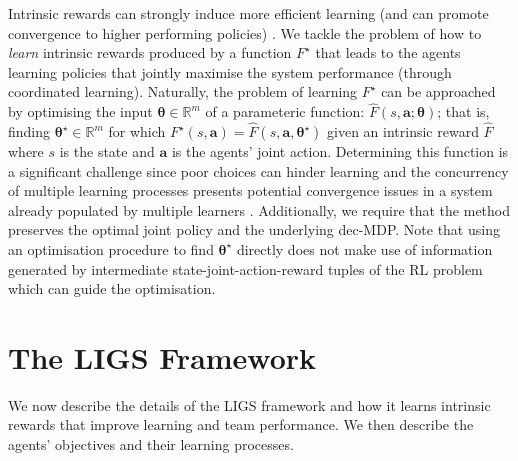 \documentclass{article}
\begin{document}
Intrinsic rewards can strongly induce more efficient learning (and can promote convergence to higher performing policies) \cite{devlin2011theoretical}. We tackle the problem of how to \textit{learn} intrinsic rewards produced by a function $F^\star$ that leads to the agents learning policies that jointly maximise the system performance (through coordinated learning). Naturally, the problem of learning $F^\star$ can be approached by optimising the input $\boldsymbol{\theta}\in\mathbb{R}^m$ of a parameteric function: $\hat{F}(s,\boldsymbol{a};\boldsymbol{\theta}) $; that is, finding $\boldsymbol{\theta^\star}\in\mathbb{R}^m$ for which $F^\star(s,\boldsymbol{a})=\hat{F}(s,\boldsymbol{a},\boldsymbol{\theta^\star})$ 
given an intrinsic reward $\hat{F}$ where $s$ is the state and $\boldsymbol{a}$ is the agents' joint action.
% 
Determining this function is a significant challenge since poor choices can hinder learning and the concurrency of multiple learning processes presents potential convergence issues in a system already populated by multiple learners \cite{zinkevich2006cyclic}. Additionally, we require that the method preserves the optimal joint policy and the underlying dec-MDP. Note that using an optimisation procedure to find $\boldsymbol{\theta^\star}$ directly does not make use of information generated by intermediate  state-joint-action-reward tuples of the RL problem which can guide the optimisation.  


\section{The LIGS Framework} 

 




We now describe the details of the LIGS framework and how it learns intrinsic rewards that improve learning and team performance. We then describe the agents' objectives and their learning processes.  
\end{document}
